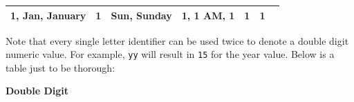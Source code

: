 \documentclass[12pt,]{article}
\begin{document}
\begin{longtable}[c]{@{}lllllll@{}}
\begin{minipage}[t]{0.19\columnwidth}\raggedright\strut
1, Jan, January
\strut\end{minipage} &
\begin{minipage}[t]{0.06\columnwidth}\raggedright\strut
1
\strut\end{minipage} &
\begin{minipage}[t]{0.15\columnwidth}\raggedright\strut
Sun, Sunday
\strut\end{minipage} &
\begin{minipage}[t]{0.14\columnwidth}\raggedright\strut
1, 1 AM, 1
\strut\end{minipage} &
\begin{minipage}[t]{0.10\columnwidth}\raggedright\strut
1
\strut\end{minipage} &
\begin{minipage}[t]{0.10\columnwidth}\raggedright\strut
1
\strut\end{minipage}\tabularnewline
\bottomrule
\end{longtable}

Note that every single letter identifier can be used twice to denote a
double digit numeric value. For example, \texttt{yy} will result in
\texttt{15} for the year value. Below is a table just to be thorough:

\textbf{Double Digit}
\end{document}
